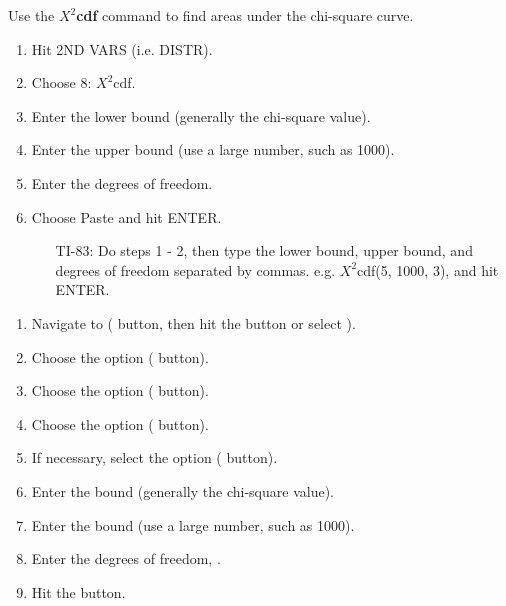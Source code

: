 \begin{termBox}{
Use the \textbf{$X^2$cdf} command to find areas under the chi-square curve.
\begin{enumerate}
\setlength{\itemsep}{0mm}
\item Hit 2ND VARS (i.e. DISTR).
\item Choose 8: $X^2$cdf.
\item Enter the lower bound (generally the chi-square value).
\item Enter the upper bound (use a large number, such as 1000).
\item Enter the degrees of freedom.
\item Choose Paste and hit ENTER.
\begin{itemize}
\item[TI-83: ] Do steps 1 - 2, then type the lower bound, upper bound, and degrees of freedom separated by commas. e.g. $X^2$cdf(5, 1000, 3), and hit ENTER.
\end{itemize}
\end{enumerate}
}
\end{termBox}

\begin{termBox}{
\begin{enumerate}
\setlength{\itemsep}{0mm}
\item Navigate to  ( button, then hit the  button or select ).
\item Choose the  option ( button).
\item Choose the  option ( button).
\item Choose the  option ( button).
\item If necessary, select the  option ( button).
\item Enter the  bound (generally the chi-square value).
\item Enter the  bound (use a large number, such as 1000).
\item Enter the degrees of freedom, .
\item Hit the  button.
\end{enumerate}
}
\end{termBox}

